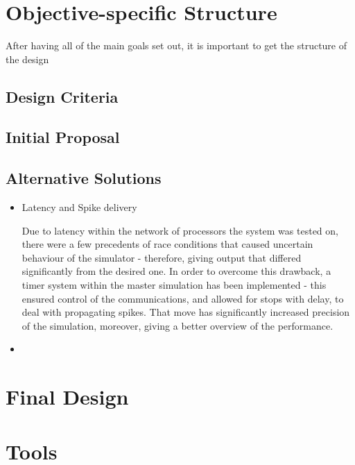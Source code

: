\section{Objective-specific Structure}

After having all of the main goals set out, it is important to get the structure of the design 

\subsection{Design Criteria}

\subsection{Initial Proposal}

\subsection{Alternative Solutions}
\begin{itemize}

\item {Latency and Spike delivery}

Due to latency within the network of processors the system was tested on, there were a few precedents of race conditions that caused uncertain behaviour of the simulator - therefore, giving output that differed significantly from the desired one. In order to overcome this drawback, a timer system within the master simulation has been implemented - this ensured control of the communications, and allowed for stops with delay, to deal with propagating spikes. That move has significantly increased precision of the simulation, moreover, giving a better overview of the performance.

\item {}

\end{itemize}


\section{Final Design}

\section{Tools}
